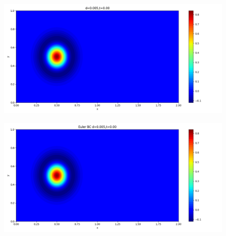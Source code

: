 \documentclass[12pt]{article}
\begin{document}
\begin{figure}[H]
\centering
\begin{minipage}{\linewidth}
\centering
\begin{minipage}{0.5\textwidth}
\includegraphics[width=\linewidth]{figures/3d0.005t0.00.png}
\label{fig1}
\end{minipage}\hfill
\begin{minipage}{0.5\textwidth}
\includegraphics[width=\linewidth]{figures/3Ed0.005t0.00.png}
\label{fig2}
\end{minipage}
\vspace{-1.5em}


\end{minipage}
\end{figure}
\end{document}
